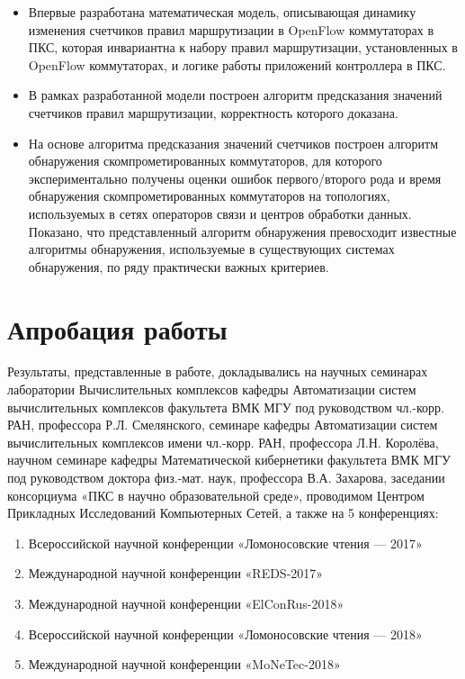 \documentclass[../thesis.tex]{subfiles}
\begin{document}
\begin{itemize}
\item Впервые разработана математическая модель, описывающая динамику изменения счетчиков правил маршрутизации в OpenFlow коммутаторах в ПКС, которая инвариантна к набору правил маршрутизации, установленных в OpenFlow коммутаторах, и логике работы приложений контроллера в ПКС.

\item В рамках разработанной модели построен алгоритм предсказания значений счетчиков правил маршрутизации, корректность которого доказана.

\item На основе алгоритма предсказания значений счетчиков построен алгоритм обнаружения скомпрометированных коммутаторов, для которого экспериментально получены оценки ошибок первого/второго рода и время обнаружения скомпрометированных коммутаторов на топологиях, используемых в сетях операторов связи и центров обработки данных.
Показано, что представленный алгоритм обнаружения превосходит известные алгоритмы обнаружения, используемые в существующих системах обнаружения, по ряду практически важных критериев.
\end{itemize}

\section*{Апробация работы}

Результаты, представленные в работе, докладывались на научных семинарах лаборатории Вычислительных комплексов кафедры Автоматизации систем вычислительных комплексов факультета ВМК МГУ под руководством чл.-корр. РАН, профессора Р.Л. Смелянского, семинаре кафедры Автоматизации систем вычислительных комплексов имени чл.-корр. РАН, профессора Л.Н. Королёва, научном семинаре кафедры Математической кибернетики факультета ВМК МГУ под руководством доктора физ.-мат. наук, профессора В.А. Захарова, заседании консорциума «ПКС в научно образовательной среде», проводимом Центром Прикладных Исследований Компьютерных Сетей, а также на 5 конференциях:
\begin{enumerate}
\item Всероссийской научной конференции «Ломоносовские чтения --- 2017»
\item Международной научной конференции «REDS-2017»
\item Международной научной конференции «ElConRus-2018»
\item Всероссийской научной конференции «Ломоносовские чтения --- 2018»
\item Международной научной конференции «MoNeTec-2018»
\end{enumerate}
\end{document}
